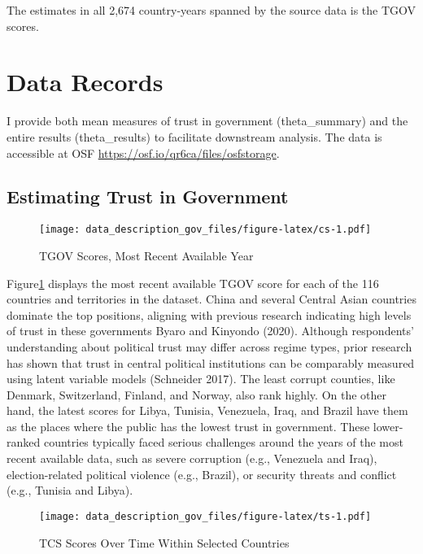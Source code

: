 \documentclass[
  12pt,
]{article}
\begin{document}
The estimates in all 2,674 country-years spanned by the source data is the TGOV scores.

\section{Data Records}\label{data-records}

I provide both mean measures of trust in government (theta\_summary) and the entire results (theta\_results) to facilitate downstream analysis.
The data is accessible at OSF \url{https://osf.io/qr6ca/files/osfstorage}.

\subsection{Estimating Trust in Government}\label{estimating-trust-in-government}

\begin{figure}
\centering
\texttt{[image: data\_description\_gov\_files/figure-latex/cs-1.pdf]}
\caption{\label{fig:cs}TGOV Scores, Most Recent Available Year \label{cs_mry}}
\end{figure}

Figure\nobreakspace{}\ref{cs_mry} displays the most recent available TGOV score for each of the 116 countries and territories in the dataset.
China and several Central Asian countries dominate the top positions, aligning with previous research indicating high levels of trust in these governments Byaro and Kinyondo (2020).
Although respondents' understanding about political trust may differ across regime types, prior research has shown that trust in central political institutions can be comparably measured using latent variable models (Schneider 2017).
The least corrupt counties, like Denmark, Switzerland, Finland, and Norway, also rank highly.
On the other hand, the latest scores for Libya, Tunisia, Venezuela, Iraq, and Brazil have them as the places where the public has the lowest trust in government.
These lower-ranked countries typically faced serious challenges around the years of the most recent available data, such as severe corruption (e.g., Venezuela and Iraq), election-related political violence (e.g., Brazil), or security threats and conflict (e.g., Tunisia and Libya).

\begin{figure}
\centering
\texttt{[image: data\_description\_gov\_files/figure-latex/ts-1.pdf]}
\caption{\label{fig:ts}TCS Scores Over Time Within Selected Countries \label{ts_plots}}
\end{figure}
\end{document}
